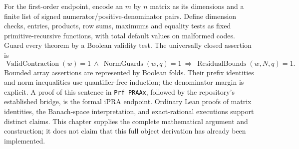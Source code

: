 For the first-order endpoint, encode an $m$ by $n$ matrix as its dimensions
and a finite list of signed numerator/positive-denominator pairs.  Define
dimension checks, entries, products, row sums, maximums and equality tests
as fixed primitive-recursive functions, with total default values on
malformed codes.  Guard every theorem by a Boolean validity test.  The
universally closed assertion is
\[
 \operatorname{ValidContraction}(w)=1\ \wedge\
 \operatorname{NormGuards}(w,q)=1
 \ \Longrightarrow\
 \operatorname{ResidualBounds}(w,N,q)=1.
\]
Bounded array assertions are represented by Boolean folds.  Their prefix
identities and norm inequalities use quantifier-free induction; the
denominator margin is explicit.  A proof of this sentence in
\texttt{Prf PRAAx}, followed by the repository's established bridge, is the
formal iPRA endpoint.  Ordinary Lean proofs of matrix identities, the
Banach-space interpretation, and exact-rational executions support distinct
claims.  This chapter supplies the complete mathematical argument and
construction; it does not claim that this full object derivation has already
been implemented.
